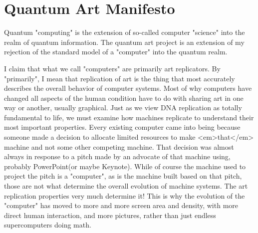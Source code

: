 \documentclass[11pt]{article}
\begin{document}
\section{
Quantum Art Manifesto}




Quantum "computing" is the extension of so-called computer "science" into the realm of quantum information.  The quantum art project is an extension of my rejection of the standard model of a "computer" into the quantum realm.




    I claim that what we call "computers" are primarily art replicators.  By "primarily", I mean that replication of art is the thing that most accurately describes the overall behavior of computer systems.  Most of why computers have changed all aspects of the human condition have to do with sharing art in one way or another, usually graphical.  Just as we view DNA replication as totally fundamental to life, we must examine how machines replicate to understand their most important properties.  Every existing computer came into being because someone made a decision to allocate limited resources to make <em>that</em> machine and not some other competing machine.  That decision was almost always in response to a pitch made by an advocate of that machine using, probably PowerPoint(or maybe Keynote).  While of course the machine used to project the pitch is a "computer", as is the machine built based on that pitch, those are not what determine the overall evolution of machine systems.  The art replication properties very much determine it!  This is why the evolution of the "computer" has moved to more and more screen area and density, with more direct human interaction, and more pictures, rather than just endless supercomputers doing math. 
\end{document}
